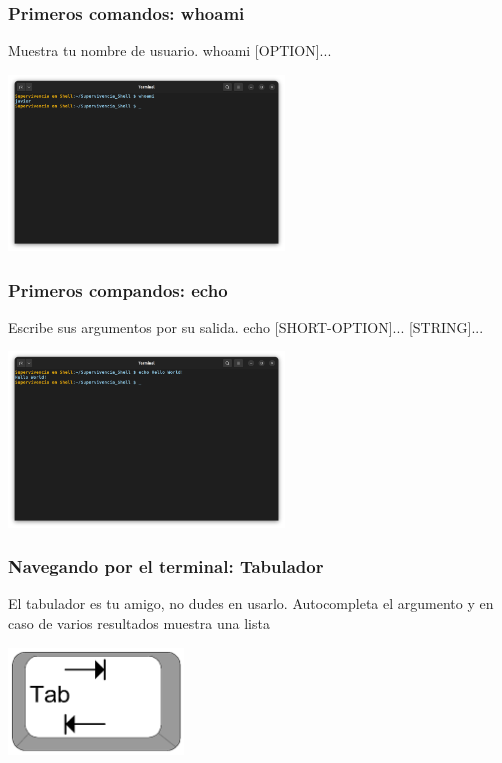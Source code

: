 \documentclass[10pt]{beamer}
\begin{document}
	\begin{frame}
		\frametitle{Primeros comandos: whoami}
		\begin{alertblock}{Muestra tu nombre de usuario.}
			whoami [OPTION]...
		\end{alertblock}
		\begin{center}
			\includegraphics[width=0.55\textwidth]{whoami}
		\end{center}
	\end{frame}
	
	\begin{frame}
		\frametitle{Primeros compandos: echo}
		\begin{alertblock}{Escribe sus argumentos por su salida.}
			echo [SHORT-OPTION]... [STRING]...
		\end{alertblock}
		\begin{center}
			\includegraphics[width=0.55\textwidth]{echo}
		\end{center}
	\end{frame}
	
	\begin{frame}
		\frametitle{Navegando por el terminal: Tabulador}
		\begin{alertblock}{El tabulador es tu amigo, no dudes en usarlo.}
			Autocompleta el argumento y en caso de varios resultados muestra una lista
		\end{alertblock}
		\begin{center}
			\includegraphics[width=0.35\textwidth]{tab}
		\end{center}
	\end{frame}
	
\end{document}
